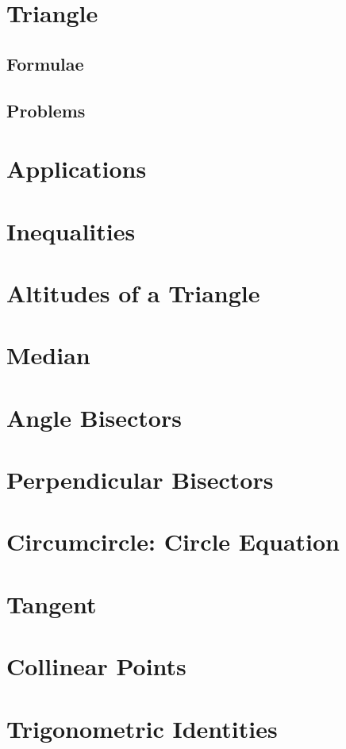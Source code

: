 \documentclass[journal]{IEEEtran}
\begin{document}
\newpage


\tableofcontents

\newpage
\onecolumn


\renewcommand{\thetable}{\theenumi}

\section{Triangle}
\subsection{Formulae}

\subsection{Problems}

\section{Applications}

%
%
\section{Inequalities}

\section{Altitudes of a Triangle}

\section{Median}

\section{Angle Bisectors}

\section{Perpendicular Bisectors}

\section{Circumcircle: Circle Equation}

\section{Tangent}

\appendices
\section{Collinear Points}

\section{Trigonometric Identities}

%
\end{document}
